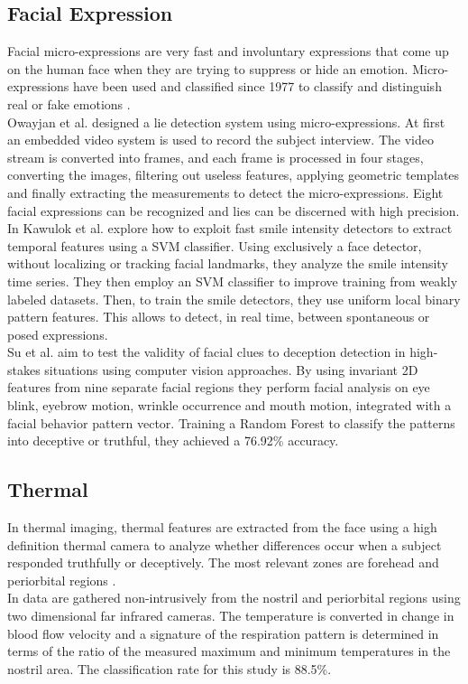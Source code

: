 \documentclass[LaM,binding=0.6cm,english,noexaminfo]{sapthesis}
\begin{document}
\subsection*{Facial Expression}
Facial micro-expressions are very fast and involuntary expressions that come up on the human face when they are trying to suppress or hide an emotion. Micro-expressions have been used and classified since 1977 to classify and distinguish real or fake emotions \cite{ekman}. \\
Owayjan et al. \cite{6462897} designed a lie detection system using micro-expressions. At first an embedded video system is used to record the subject interview. The video stream is converted into frames, and each frame is processed in four stages, converting the images, filtering out useless features, applying geometric templates and finally extracting the measurements to detect the micro-expressions. Eight facial expressions can be recognized and lies can be discerned with high precision. \\
In \cite{10.1007/978-3-319-47955-2_27} Kawulok et al. explore how to exploit fast smile intensity detectors to extract temporal features using a SVM classifier. Using exclusively a face detector, without localizing or tracking facial landmarks, they analyze the smile intensity time series. They then employ an SVM classifier to improve training from weakly labeled datasets. Then, to train the smile detectors, they use uniform local binary pattern features. This allows to detect, in real time, between spontaneous or posed expressions. \\
Su et al. \cite{SU201652} aim to test the validity of facial clues to deception detection in high-stakes situations using computer vision approaches. By using invariant 2D features from nine separate facial regions they perform facial analysis on eye blink, eyebrow motion, wrinkle occurrence and mouth motion, integrated with a facial behavior pattern vector. Training a Random Forest to classify the patterns into deceptive or truthful, they achieved a 76.92\% accuracy.

\subsection*{Thermal}
In thermal imaging, thermal features are extracted from the face using a high definition thermal camera to analyze whether differences occur when a subject responded truthfully or deceptively. The most relevant zones are forehead and periorbital regions \cite{Rajoub} \cite{Abouelenien:2015:TAD:2823465.2823470}. \\
In \cite{6967765} data are gathered non-intrusively from the nostril and periorbital regions using two dimensional far infrared cameras. The temperature is converted in change in blood flow velocity and a signature of the respiration pattern is determined in terms of the ratio of the measured maximum and minimum temperatures in the nostril area. The classification rate for this study is 88.5\%.
\end{document}
